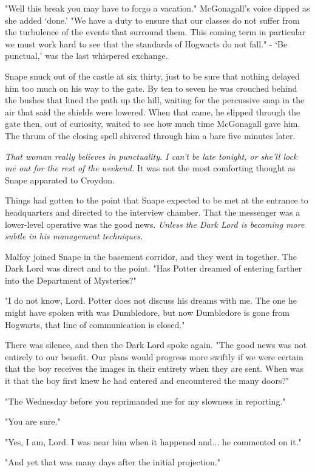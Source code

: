 \documentclass[a4paper,11pt]{article}
\begin{document}
"Well this break you may have to forgo a vacation." McGonagall's voice dipped as she added `done.' "We have a duty to ensure that our classes do not suffer from the turbulence of the events that surround them. This coming term in particular we must work hard to see that the standards of Hogwarts do not fall." - `Be punctual,' was the last whispered exchange.

Snape snuck out of the castle at six thirty, just to be sure that nothing delayed him too much on his way to the gate. By ten to seven he was crouched behind the bushes that lined the path up the hill, waiting for the percussive snap in the air that said the shields were lowered. When that came, he slipped through the gate then, out of curiosity, waited to see how much time McGonagall gave him. The thrum of the closing spell shivered through him a bare five minutes later.

\emph{That woman really believes in punctuality. I can't be late tonight, or she'll lock me out for the rest of the weekend.} It was not the most comforting thought as Snape apparated to Croydon.

Things had gotten to the point that Snape expected to be met at the entrance to headquarters and directed to the interview chamber. That the messenger was a lower-level operative was the good news. \emph{Unless the Dark Lord is becoming more subtle in his management techniques.}

Malfoy joined Snape in the basement corridor, and they went in together. The Dark Lord was direct and to the point. "Has Potter dreamed of entering farther into the Department of Mysteries?"

"I do not know, Lord. Potter does not discuss his dreams with me. The one he might have spoken with was Dumbledore, but now Dumbledore is gone from Hogwarts, that line of communication is closed."

There was silence, and then the Dark Lord spoke again. "The good news was not entirely to our benefit. Our plans would progress more swiftly if we were certain that the boy receives the images in their entirety when they are sent. When was it that the boy first knew he had entered and encountered the many doors?"

"The Wednesday before you reprimanded me for my slowness in reporting."

"You are sure."

"Yes, I am, Lord. I was near him when it happened and... he commented on it."

"And yet that was many days after the initial projection."
\end{document}
